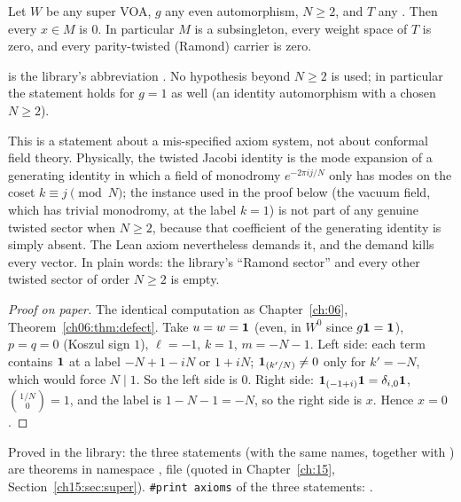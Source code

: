 \begin{theorem}\label{l17:thm:twistvacuous}
Let $W$ be any super VOA, $g$ any even automorphism, $N\ge2$, and $T$ any
. Then every $x\in M$ is $0$. In particular $M$ is a
subsingleton, every weight space of $T$ is zero, and every parity-twisted (Ramond) carrier
 is zero.
\end{theorem}
\begin{dictionary}
 is the library's abbreviation
. No hypothesis beyond $N\ge2$ is used; in particular the
statement holds for $g=1$ as well (an identity automorphism with a chosen $N\ge 2$).
\end{dictionary}
\begin{physics}
This is a statement about a mis-specified axiom system, not about conformal field theory. Physically,
the twisted Jacobi identity is the mode expansion of a generating identity in which a field of
monodromy $e^{-2\pi ij/N}$ only has modes on the coset $k\equiv j\pmod N$; the instance used in the
proof below (the vacuum field, which has trivial monodromy, at the label $k=1$) is not part of any
genuine twisted sector when $N\ge2$, because that coefficient of the generating identity is simply
absent. The Lean axiom nevertheless demands it, and the demand kills every vector. In plain words:
the library's ``Ramond sector'' and every other twisted sector of order $N\ge2$ is empty.
\end{physics}
\begin{proof}[Proof on paper]
The identical computation as Chapter~\ref{ch:06}, Theorem~\ref{ch06:thm:defect}. Take
$u=w=\mathbf{1}$ (even, in $W^0$ since $g\mathbf{1}=\mathbf{1}$), $p=q=0$ (Koszul sign
$1$), $\ell=-1$, $k=1$, $m=-N-1$. Left side: each term contains $\mathbf{1}$ at a label
$-N+1-iN$ or $1+iN$; $\mathbf{1}_{(k'/N)}\neq0$ only for $k'=-N$, which would force $N\mid1$.
So the left side is $0$. Right side: $\mathbf{1}_{(-1+i)}\mathbf{1}=\delta_{i,0}\mathbf{1}$,
$\binom{1/N}0=1$, and the label is $1-N-1=-N$, so the right side is $x$. Hence $x=0$.
\end{proof}
\begin{status}
Proved in the library: the three statements (with the same names, together with
) are theorems in namespace , file
 (quoted in Chapter~\ref{ch:15},
Section~\ref{ch15:sec:super}). \texttt{\#print axioms} of the three statements: .
\end{status}

